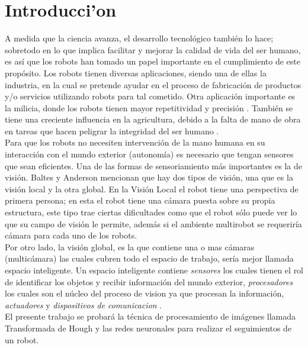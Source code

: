 
\chapter*{Introducci'on}

A medida que la ciencia avanza, el desarrollo tecnol\'ogico tambi\'en lo hace; sobretodo en lo que implica facilitar y mejorar la calidad de vida del ser humano, es as\'i que los robots han tomado un papel importante en el cumplimiento de este prop\'osito. Los robots tienen diversas aplicaciones, siendo una de ellas la industria, en la cual se pretende ayudar en el proceso de fabricaci\'on de productos y/o servicios utilizando robots para tal cometido\cite{Morales_g}. Otra aplicaci\'on importante es la milicia, donde los robots tienen mayor repetitividad y precisi\'on \cite{Garcia_g}. Tambi\'en se tiene una creciente influencia en la agricultura, debido a la falta de mano de obra en tareas que hacen peligrar la integridad del ser humano \cite{Vasquez_g}.\\
Para que los robots no necesiten intervenci\'on de la  mano humana  en  su  interacci\'on    con el mundo exterior (autonom\'ia) es necesario que tengan sensores que sean eficientes. Una de las formas de sensoriamiento m\'as importantes es la de visi\'on. Baltes y Anderson mencionan que hay dos tipos de visi\'on, una que es la visi\'on local y la otra global. En la Visi\'on Local el robot tiene  una perspectiva de primera persona; en esta el robot tiene una c\'amara puesta sobre su propia estructura, este tipo trae ciertas dificultades como que el robot s\'olo puede ver lo que su campo de visi\'on le permite, adem\'as si el ambiente multirobot se requerir\'ia c\'amara para cada uno de los robots.  \cite {Baltes_g} \\
Por otro lado, la visi\'on global, es la que contiene una o mas c\'amaras (multic\'amara) las cuales cubren todo el espacio de trabajo, ser\'ia mejor llamada  espacio inteligente. Un espacio inteligente contiene \textit{sensores} los cuales tienen el rol de identificar los objetos y recibir informaci\'on del mundo exterior, \textit{procesadores} los cuales  son el n\'ucleo del proceso de vision ya que procesan la informaci\'on, \textit{actuadores}  y \textit{dispositivos de comunicacion} \cite{Brezac_g}.\\

El presente trabajo se probar\'a la t\'ecnica de procesamiento de im\'agenes llamada Transformada de Hough y las redes neuronales  para realizar el seguimientos de un robot. \\
